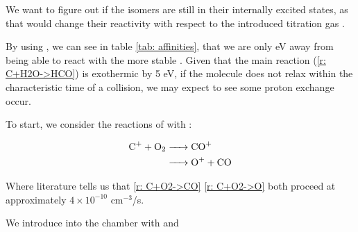 We want to figure out if the \ce{[HCO]+} isomers are still in their internally excited states, as that would change their reactivity with respect to the introduced titration gas .

By using , we can see in table \ref{tab: affinities}, that we are only  eV away from being able to react with the more stable . Given that the main reaction (\ref{r: C+H2O->HCO}) is exothermic by 5 eV, if the molecule does not relax within the characteristic time of a collision, we may expect to see some proton exchange occur.

To start, we consider the reactions of  with :

\begin{align}
	\ce{C+ + O2 & -> CO+} \label{r: C+O2->CO} \\
	\ce{& -> O+ + CO} \label{r: C+O2->O}
\end{align}

Where literature tells us that \ref{r: C+O2->CO} \ref{r: C+O2->O} both proceed at approximately $4 \times 10^{-10}$ cm$^{-3}$/s.

We introduce  into the chamber with  and 